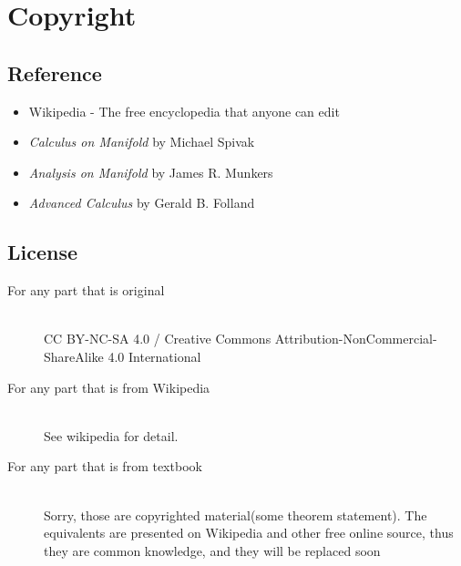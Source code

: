 \section{Copyright}

\subsection{Reference}
\begin{itemize}
\item Wikipedia - The free encyclopedia that anyone can edit
\item \textit{Calculus on Manifold} by Michael Spivak
\item \textit{Analysis on Manifold} by James R. Munkers
\item \textit{Advanced Calculus} by Gerald B. Folland
\end{itemize}

\subsection{License}

\begin{description}
\item[For any part that is original] \hfill\\
	CC BY-NC-SA 4.0 / Creative Commons Attribution-NonCommercial-ShareAlike 4.0 International
\item[For any part that is from Wikipedia] \hfill\\
	See wikipedia for detail.
\item[For any part that is from textbook] \hfill\\
	Sorry, those are copyrighted material(some theorem statement).\newline
	The equivalents are presented on Wikipedia and other free online source, thus they are common knowledge, and they will be replaced soon
\end{description}


